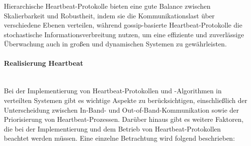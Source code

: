 \documentclass[../vs-script-first-v01.tex]{subfiles}
\begin{document}
Hierarchische Heartbeat-Protokolle bieten eine gute Balance zwischen Skalierbarkeit und Robustheit, indem sie die Kommunikationslast über verschiedene Ebenen verteilen, während gossip-basierte Heartbeat-Protokolle die stochastische Informationsverbreitung nutzen, um eine effiziente und zuverlässige Überwachung auch in großen und dynamischen Systemen zu gewährleisten.
\paragraph{Realisierung Heartbeat}\mbox{}\\
Bei der Implementierung von Heartbeat-Protokollen und -Algorithmen in verteilten Systemen gibt es wichtige Aspekte zu berücksichtigen, einschließlich der Unterscheidung zwischen In-Band- und Out-of-Band-Kommunikation sowie der Priorisierung von Heartbeat-Prozessen. Darüber hinaus gibt es weitere Faktoren, die bei der Implementierung und dem Betrieb von Heartbeat-Protokollen beachtet werden müssen. Eine einzelne Betrachtung wird folgend beschrieben:
\end{document}
